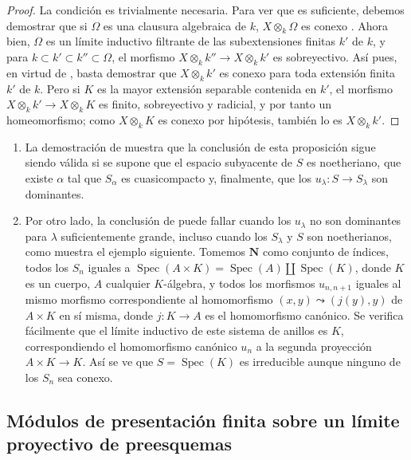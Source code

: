 \begin{proof}
La condición es trivialmente necesaria.
Para ver que es suficiente, debemos demostrar que si $\Omega$ es una clausura algebraica de $k$, $X\otimes_k\Omega$ es conexo .
Ahora bien, $\Omega$ es un límite inductivo filtrante de las subextensiones finitas $k'$ de $k$, y para $k\subset k'\subset k''\subset\Omega$, el morfismo $X\otimes_k k''\to X\otimes_k k'$ es sobreyectivo.
Así pues, en virtud de , basta demostrar que $X\otimes_k k'$ es conexo para toda extensión finita $k'$ de $k$.
Pero si $K$ es la mayor extensión separable contenida en $k'$, el morfismo $X\otimes_k k'\to X\otimes_k K$ es finito, sobreyectivo y radicial, y por tanto  un homeomorfismo; como $X\otimes_k K$ es conexo por hipótesis, también lo es $X\otimes_k k'$.
\end{proof}

\begin{remark}[8.4.6]
\label{IV.8.4.6-fr}
\begin{enumerate}[label=(\roman*)]
  \item La demostración de  muestra que la conclusión de esta proposición sigue siendo válida si se supone que el espacio subyacente de $S$ es noetheriano, que existe $\alpha$ tal que $S_\alpha$ es cuasicompacto y, finalmente, que los $u_\lambda:S\to S_\lambda$ son dominantes.
  \item Por otro lado, la conclusión de  puede fallar cuando los $u_\lambda$ no son dominantes para $\lambda$ suficientemente grande, incluso cuando los $S_\lambda$ y $S$ son noetherianos, como muestra el ejemplo siguiente.
Tomemos $\mathbf N$ como conjunto de índices, todos los $S_n$ iguales a $\operatorname{Spec}(A\times K)=\operatorname{Spec}(A)\amalg
  \operatorname{Spec}(K)$, donde $K$ es un cuerpo, $A$ cualquier $K$-álgebra, y todos los morfismos $u_{n,n+1}$ iguales al mismo morfismo correspondiente al homomorfismo $(x,y)\leadsto(j(y),y)$ de $A\times K$ en sí misma, donde $j:K\to A$ es el homomorfismo canónico.
Se verifica fácilmente que el límite inductivo de este sistema de anillos es $K$, correspondiendo el homomorfismo canónico $u_n$ a la segunda proyección $A\times K\to K$.
Así se ve que $S=\operatorname{Spec}(K)$ es irreducible aunque ninguno de los $S_n$ sea conexo.
\end{enumerate}
\end{remark}

\subsection{Módulos de presentación finita sobre un límite proyectivo de preesquemas}
\label{subsection:IV.8.5-fr}

